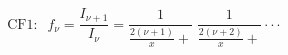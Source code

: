 \documentclass[12pt]{article}
\begin{document}
\begin{displaymath}
\textrm{CF1}:\;\;
f_\nu = \frac{I_{\nu+1}}{I_\nu}
      = \frac{1}{\frac{2(\nu+1)}{x}+} \; \frac{1}{\frac{2(\nu+2)}{x}+} \cdot\cdot\cdot
\end{displaymath}
\end{document}
